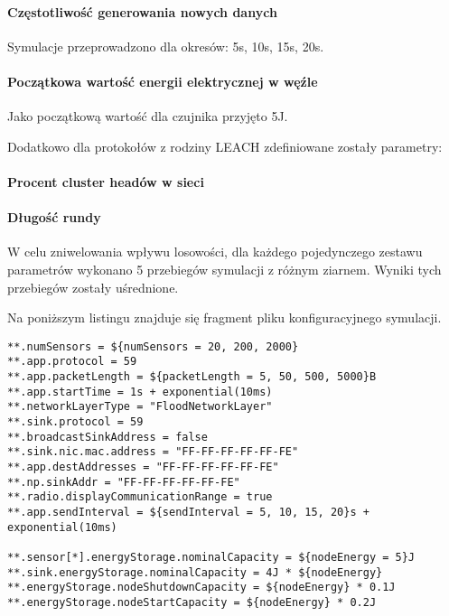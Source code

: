\paragraph{Częstotliwość generowania nowych danych}
Symulacje przeprowadzono dla okresów: 5s, 10s, 15s, 20s.
\paragraph{Początkowa wartość energii elektrycznej w węźle}
Jako początkową wartość dla czujnika przyjęto 5J.

Dodatkowo dla protokołów z rodziny LEACH zdefiniowane zostały parametry:
\paragraph{Procent cluster headów w sieci}
\paragraph{Długość rundy}

W celu zniwelowania wpływu losowości, dla każdego pojedynczego zestawu parametrów wykonano 5 przebiegów symulacji z różnym ziarnem. Wyniki tych przebiegów zostały uśrednione.

Na poniższym listingu znajduje się fragment pliku konfiguracyjnego symulacji.
\begin{verbatim}
**.numSensors = ${numSensors = 20, 200, 2000}
**.app.protocol = 59
**.app.packetLength = ${packetLength = 5, 50, 500, 5000}B
**.app.startTime = 1s + exponential(10ms)
**.networkLayerType = "FloodNetworkLayer"
**.sink.protocol = 59
**.broadcastSinkAddress = false
**.sink.nic.mac.address = "FF-FF-FF-FF-FF-FE"
**.app.destAddresses = "FF-FF-FF-FF-FF-FE"
**.np.sinkAddr = "FF-FF-FF-FF-FF-FE"
**.radio.displayCommunicationRange = true
**.app.sendInterval = ${sendInterval = 5, 10, 15, 20}s + exponential(10ms)

**.sensor[*].energyStorage.nominalCapacity = ${nodeEnergy = 5}J
**.sink.energyStorage.nominalCapacity = 4J * ${nodeEnergy}
**.energyStorage.nodeShutdownCapacity = ${nodeEnergy} * 0.1J
**.energyStorage.nodeStartCapacity = ${nodeEnergy} * 0.2J
\end{verbatim}